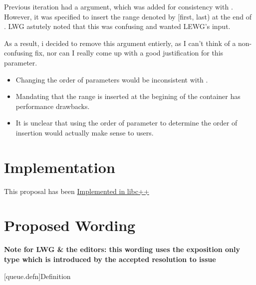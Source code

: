 \documentclass{wg21}
\begin{document}
Previous iteration had a  argument, which was added for consistency
with .
However, it was specified to insert the range denoted by [first, last) at the end of .
LWG astutely noted that this was confusing and wanted LEWG's input.

As a result, i decided to remove this argument entierly, as I can't think of a non-confusing fix, 
nor can I really come up with a good justification for this parameter.

\begin{itemize}
\item Changing the order of parameters would be inconsistent with .
\item Mandating that the range is inserted at the begining of the container has performance drawbacks.
\item It is unclear that using the order of parameter to determine the order of insertion would actually make sense to users.
\end{itemize}

\section{Implementation}

This proposal has been \href{https://github.com/cor3ntin/llvm-project/tree/stack_queue_iterators}{Implemented in libc++}

\section{Proposed Wording}

\textbf{Note for LWG \& the editors: this wording uses the exposition only  type which
is introduced by the accepted resolution to issue }

[queue.defn]{Definition}
	
\end{document}
